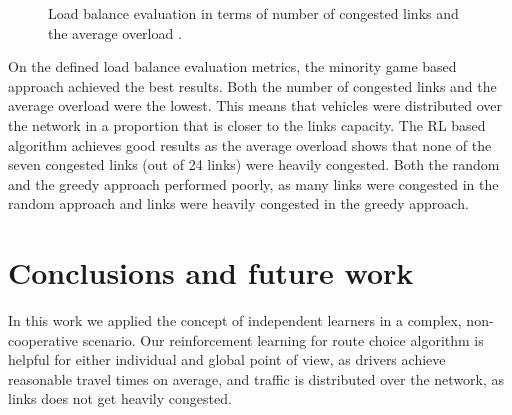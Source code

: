 \documentclass[12pt]{llncs}
\begin{document}
\begin{figure}[ht]
  \centering
  \caption{Load balance evaluation in terms of number of congested links  and the average overload .}
  \label{fig:loadBalance}
\end{figure}

On the defined load balance evaluation metrics, the minority game based approach achieved the best results. Both the number of congested links and the average overload were the lowest. This means that vehicles were distributed over the network in a proportion that is closer to the links capacity. The RL based algorithm achieves good results as the average overload shows that none of the seven congested links (out of 24 links) were heavily congested. Both the random and the greedy approach performed poorly, as many links were congested in the random approach and links were heavily congested in the greedy approach.

\section{Conclusions and future work}
\label{sec:conclusions}

In this work we applied the concept of independent learners in a complex, non-cooperative scenario. Our reinforcement learning for route choice algorithm is helpful for either individual and global point of view, as drivers achieve reasonable travel times on average, and traffic is distributed over the network, as links does not get heavily congested.
\end{document}
